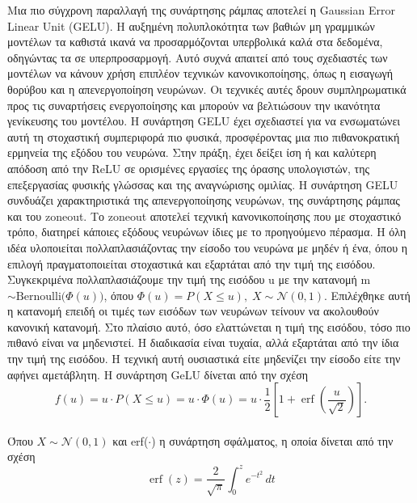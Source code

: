 \documentclass[12pt]{article}
\numberwithin{equation}{section}
\begin{document}
Μια πιο σύγχρονη παραλλαγή της συνάρτησης ράμπας αποτελεί η Gaussian Error Linear Unit (GELU). Η αυξημένη πολυπλοκότητα των βαθιών μη γραμμικών μοντέλων τα καθιστά ικανά να προσαρμόζονται υπερβολικά καλά στα δεδομένα, οδηγώντας τα σε υπερπροσαρμογή. Αυτό συχνά απαιτεί από τους σχεδιαστές των μοντέλων να κάνουν χρήση επιπλέον τεχνικών κανονικοποίησης, όπως η εισαγωγή θορύβου και η απενεργοποίηση νευρώνων. Οι τεχνικές αυτές δρουν συμπληρωματικά προς τις συναρτήσεις ενεργοποίησης και μπορούν να βελτιώσουν την ικανότητα γενίκευσης του μοντέλου. Η συνάρτηση GELU έχει σχεδιαστεί για να ενσωματώνει αυτή τη στοχαστική συμπεριφορά πιο φυσικά, προσφέροντας μια πιο πιθανοκρατική ερμηνεία της εξόδου του νευρώνα. Στην πράξη, έχει δείξει ίση ή και καλύτερη απόδοση από την ReLU σε ορισμένες εργασίες της όρασης υπολογιστών, της επεξεργασίας φυσικής γλώσσας και της αναγνώρισης ομιλίας. Η συνάρτηση GELU συνδυάζει χαρακτηριστικά της απενεργοποίησης νευρώνων, της συνάρτησης ράμπας και του zoneout. Το zoneout αποτελεί τεχνική κανονικοποίησης που με στοχαστικό τρόπο, διατηρεί κάποιες εξόδους νευρώνων ίδιες με το προηγούμενο πέρασμα. Η όλη ιδέα υλοποιείται πολλαπλασιάζοντας την είσοδο του νευρώνα με μηδέν ή ένα, όπου η επιλογή πραγματοποιείται στοχαστικά και εξαρτάται από την τιμή της εισόδου. Συγκεκριμένα πολλαπλασιάζουμε την τιμή της εισόδου u με την κατανομή m \(\sim \mathrm{Bernoulli}\bigl(\Phi(u)\bigr)\), όπου \(\Phi(u) = P(X \leq u), \; X \sim \mathcal{N}(0, 1)\). Επιλέχθηκε αυτή η κατανομή επειδή οι τιμές των εισόδων των νευρώνων τείνουν να ακολουθούν κανονική κατανομή. Στο πλαίσιο αυτό, όσο ελαττώνεται η τιμή της εισόδου, τόσο πιο πιθανό είναι να μηδενιστεί. Η διαδικασία είναι τυχαία, αλλά εξαρτάται από την ίδια την τιμή της εισόδου. Η τεχνική αυτή ουσιαστικά είτε μηδενίζει την είσοδο είτε την αφήνει αμετάβλητη. Η συνάρτηση GeLU δίνεται από την σχέση \\

\begin{equation}
f(u) = u \cdot P(X \leq u) = u \cdot \Phi(u) = u \cdot \frac{1}{2} \left[1 + \operatorname{erf}\left(\frac{u}{\sqrt{2}}\right)\right].
\end{equation}\\

\noindent Όπου \(X \sim \mathcal{N}(0, 1)\) και erf(\(\cdot\)) η συνάρτηση σφάλματος, η οποία δίνεται από την σχέση\\

\begin{equation}
\operatorname{erf}(z) = \frac{2}{\sqrt{\pi}} \int_{0}^{z} e^{-t^2} \, dt
\end{equation}\\
\end{document}
